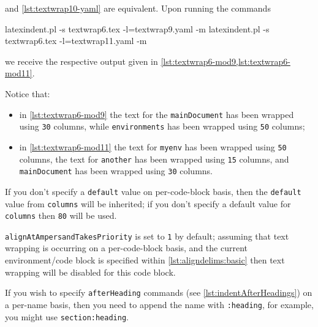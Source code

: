 	 and \cref{lst:textwrap10-yaml} are equivalent. Upon running
	the commands
	\begin{commandshell}
latexindent.pl -s textwrap6.tex -l=textwrap9.yaml -m
latexindent.pl -s textwrap6.tex -l=textwrap11.yaml -m
\end{commandshell}
	we receive the respective output given in \cref{lst:textwrap6-mod9,lst:textwrap6-mod11}.

	\begin{widepage}

	\end{widepage}

	Notice that:
	\begin{itemize}
		\item in \cref{lst:textwrap6-mod9} the text for the \texttt{mainDocument} has been wrapped
		      using \texttt{30} columns, while \texttt{environments} has been wrapped using \texttt{50}
		      columns;
		\item in \cref{lst:textwrap6-mod11} the text for \texttt{myenv} has been wrapped using
		      \texttt{50} columns, the text for \texttt{another} has been wrapped using \texttt{15}
		      columns, and \texttt{mainDocument} has been wrapped using \texttt{30} columns.
	\end{itemize}
	If you don't specify a \texttt{default} value on per-code-block basis, then the
	\texttt{default} value from \texttt{columns} will be inherited; if you don't specify a
	default value for \texttt{columns} then \texttt{80} will be used.

	\texttt{alignAtAmpersandTakesPriority} is set to \texttt{1} by default; assuming
	that text wrapping is occurring on a per-code-block basis, and the current
	environment/code block is specified within \vref{lst:aligndelims:basic} then text
	wrapping will be disabled for this code block.

	If you wish to specify \texttt{afterHeading} commands (see
	\vref{lst:indentAfterHeadings}) on a per-name basis, then you need to append the name
	with \texttt{:heading}, for example, you might use \texttt{section:heading}.
